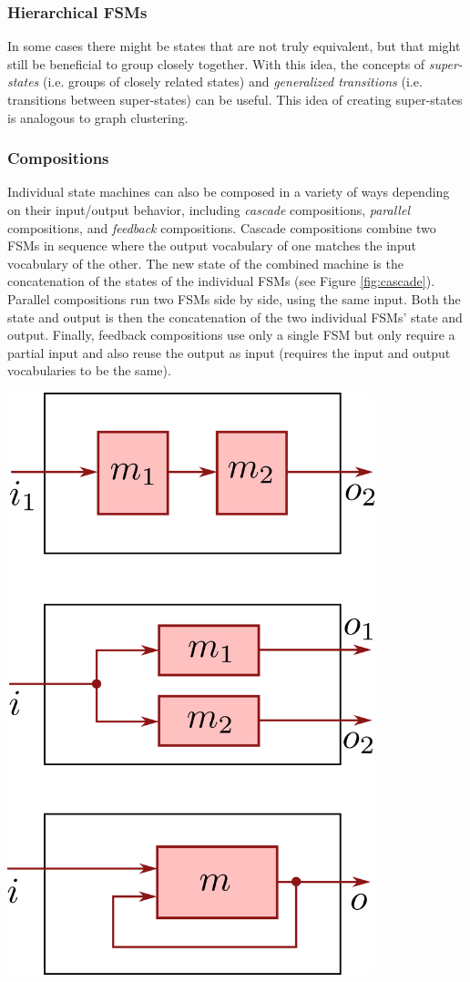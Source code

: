 \begin{example}
\subsubsection{Hierarchical FSMs}
In some cases there might be states that are not truly equivalent, but that might still be beneficial to group closely together. With this idea, the concepts of \textit{super-states} (i.e. groups of closely related states) and \textit{generalized transitions} (i.e. transitions between super-states) can be useful. This idea of creating super-states is analogous to graph clustering.

\subsubsection{Compositions}
Individual state machines can also be composed in a variety of ways depending on their input/output behavior, including \textit{cascade} compositions, \textit{parallel} compositions, and \textit{feedback} compositions. Cascade compositions combine two FSMs in sequence where the output vocabulary of one matches the input vocabulary of the other. The new state of the combined machine is the concatenation of the states of the individual FSMs (see Figure \ref{fig:cascade}). Parallel compositions run two FSMs side by side, using the same input. Both the state and output is then the concatenation of the two individual FSMs' state and output. Finally, feedback compositions use only a single FSM but only require a partial input and also reuse the output as input (requires the input and output vocabularies to be the same). \begin{marginfigure}
    \centering
    \includegraphics[width=0.8\textwidth]{tex/figs/ch21_figs/compositions.png}

\end{marginfigure}
\end{example}
